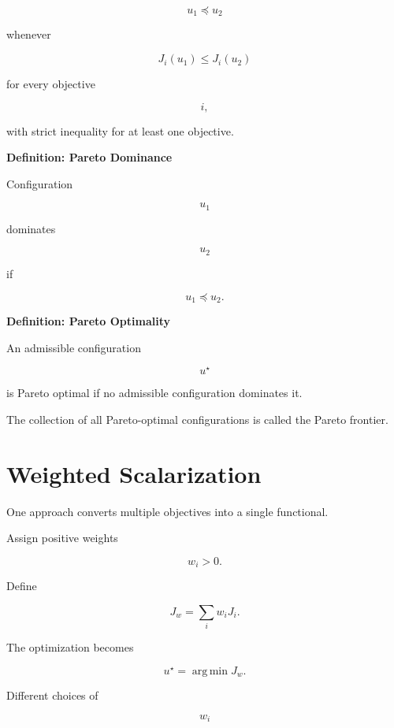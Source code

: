 \documentclass[11pt,fleqn]{book}
\numberwithin{equation}{chapter}
\newenvironment{definition}[1]
  {\begin{definitionEnv}
   \noindent\textbf{Definition: #1}\par\smallskip}
  {\end{definitionEnv}}
\theoremstyle{plain}
\theoremstyle{definition}
\theoremstyle{remark}
\begin{document}
\[
u_1
\preceq
u_2
\]

whenever

\[
J_i(u_1)
\le
J_i(u_2)
\]

for every objective

\[
i,
\]

with strict inequality for at least one objective.


\begin{definition}{Pareto Dominance}

Configuration

\[
u_1
\]

dominates

\[
u_2
\]

if

\[
u_1
\preceq
u_2.
\]

\end{definition}


\begin{definition}{Pareto Optimality}

An admissible configuration

\[
u^\star
\]

is Pareto optimal if no admissible configuration dominates it.

The collection of all Pareto-optimal configurations is called the
Pareto frontier.

\end{definition}


\section{Weighted Scalarization}

One approach converts multiple objectives into a single functional.

Assign positive weights

\[
w_i>0.
\]

Define

\[
J_w
=
\sum_i
w_iJ_i.
\]

The optimization becomes

\[
u^\star
=
\operatorname*{arg\,min}
J_w.
\]

Different choices of

\[
w_i
\]
\end{document}

